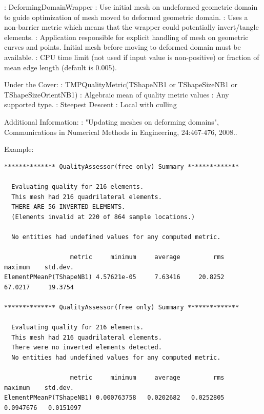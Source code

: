 : DeformingDomainWrapper \newline
{}:  Use initial mesh on undeformed geometric domain
to guide optimization of mesh moved to deformed geometric domain.  \newline
{}: Uses a non-barrier metric which means that the
wrapper could potentially invert/tangle elements.  \newline
{}:  Application responsible for explicit handling of mesh on geometric curves and points.  Initial mesh before moving to deformed domain must be available.\newline 
{}: CPU time limit (not used if input 
value is non-positive) or fraction of mean edge length (default is 0.005). \newline \newline

\noindent Under the Cover: \newline
{}: TMPQualityMetric(TShapeNB1 or TShapeSizeNB1 or TShapeSizeOrientNB1) \newline
{}: Algebraic mean of quality metric values \newline
{}: Any supported type. \newline
{}: Steepest Descent \newline
{}: Local with culling \newline

\noindent Additional Information: \newline
{}: "Updating meshes on deforming domains",  Communications in Numerical Methods in Engineering, 24:467-476, 2008..\newline

\noindent Example: \newline

\begin{verbatim}
************** QualityAssessor(free only) Summary **************

  Evaluating quality for 216 elements.
  This mesh had 216 quadrilateral elements.
  THERE ARE 56 INVERTED ELEMENTS. 
  (Elements invalid at 220 of 864 sample locations.)

  No entities had undefined values for any computed metric.

                  metric     minimum     average         rms     maximum    std.dev.
ElementPMeanP(TShapeNB1) 4.57621e-05     7.63416     20.8252     67.0217     19.3754

************** QualityAssessor(free only) Summary **************

  Evaluating quality for 216 elements.
  This mesh had 216 quadrilateral elements.
  There were no inverted elements detected. 
  No entities had undefined values for any computed metric.

                  metric     minimum     average         rms     maximum    std.dev.
ElementPMeanP(TShapeNB1) 0.000763758   0.0202682   0.0252805   0.0947676   0.0151097
\end{verbatim}


